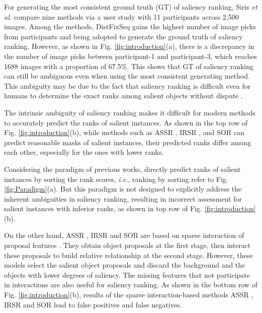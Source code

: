 \documentclass[sigconf]{acmart}
\def\etal{{\em et al.}}
\begin{document}
For generating the most consistent ground truth (GT) of saliency ranking, Siris \etal{} \cite{siris2020inferring} compare nine methods via a user study with 11 participants across 2,500 images. Among the methods, DistFixSeq gains the highest number of image picks from participants and being adopted to generate the ground truth of saliency ranking. However, as shown in Fig. \ref{fig:introduction}(a), there is a discrepancy in the number of image picks between participant-1 and participant-3, which reaches 1688 images with a proportion of 67.5\%. This shows that GT of saliency ranking can still be ambiguous even when using the most consistent generating method. This ambiguity may be due to the fact that saliency ranking is difficult even for humans to determine the exact ranks among salient objects without dispute \cite{liu2021instance}.

The intrinsic ambiguity of saliency ranking makes it difficult for modern methods to accurately predict the ranks of salient instances. As shown in the top row of Fig. \ref{fig:introduction}(b), while methods such as ASSR \cite{siris2020inferring}, IRSR \cite{liu2021instance}, and SOR \cite{fang2021salient} can predict reasonable masks of salient instances, their predicted ranks differ among each other, especially for the ones with lower ranks.%

Considering the paradigm of previous works, \cite{siris2020inferring, liu2021instance, fang2021salient, tian2022bi} directly predict ranks of salient instances by sorting the rank scores, \textit{i.e.}, ranking by sorting refer to Fig. \ref{fig:Paradigm}(a). But this paradigm is not designed to explicitly address the inherent ambiguities in saliency ranking, resulting in incorrect assessment for salient instances with inferior ranks, as shown in top row of Fig. \ref{fig:introduction}(b). 

On the other hand, ASSR \cite{siris2020inferring}, IRSR \cite{liu2021instance} and SOR \cite{fang2021salient} are based on sparse interaction of proposal features \cite{he2017mask}. They obtain object proposals at the first stage, then interact these proposals to build relative relationship at the second stage. However, these models select the salient object proposals and discard the background and the objects with lower degrees of saliency. The missing features that not participate in interactions are also useful for saliency ranking. As shown in the bottom row of Fig. \ref{fig:introduction}(b), results of the sparse interaction-based methods ASSR \cite{siris2020inferring}, IRSR \cite{liu2021instance} and SOR \cite{fang2021salient} lead to false positives and false negatives.
\end{document}

